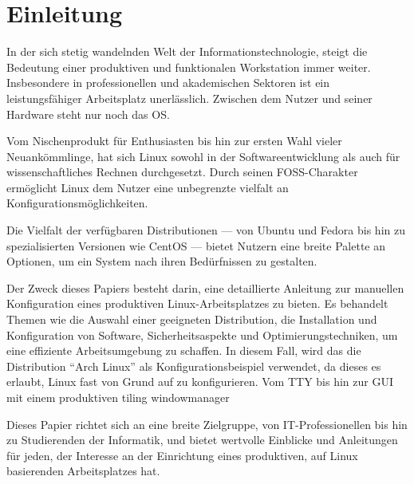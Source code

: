 \section{Einleitung}

In der sich stetig wandelnden Welt der Informationstechnologie, steigt die Bedeutung einer produktiven und funktionalen Workstation immer weiter. Insbesondere in professionellen und akademischen Sektoren ist ein leistungsfähiger Arbeitsplatz unerlässlich. Zwischen dem Nutzer und seiner Hardware steht nur noch das \Gls{OS}.

Vom Nischenprodukt für Enthusiasten bis hin zur ersten Wahl vieler Neuankömmlinge, hat sich Linux sowohl in der Softwareentwicklung als auch für wissenschaftliches Rechnen durchgesetzt. Durch seinen \gls{FOSS}-Charakter ermöglicht Linux dem Nutzer eine unbegrenzte vielfalt an Konfigurationsmöglichkeiten.

Die Vielfalt der verfügbaren Distributionen --- von Ubuntu und Fedora bis hin zu
spezialisierten Versionen wie CentOS --- bietet Nutzern eine breite Palette an
Optionen, um ein System nach ihren Bedürfnissen zu gestalten.

Der Zweck dieses Papiers besteht darin, eine detaillierte Anleitung zur
manuellen Konfiguration eines produktiven Linux-Arbeitsplatzes zu bieten. Es
behandelt Themen wie die Auswahl einer geeigneten Distribution, die Installation
und Konfiguration von Software, Sicherheitsaspekte und Optimierungstechniken, um
eine effiziente Arbeitsumgebung zu schaffen. In diesem Fall, wird das die Distribution \enquote{Arch Linux} als Konfigurationsbeispiel verwendet, da dieses es erlaubt, Linux fast von Grund auf zu konfigurieren. Vom \gls{TTY} bis hin zur \gls{GUI} mit einem produktiven \gls{tiling} \gls{windowmanager}

Dieses Papier richtet sich an eine breite Zielgruppe, von IT-Professionellen bis
hin zu Studierenden der Informatik, und bietet wertvolle Einblicke und
Anleitungen für jeden, der Interesse an der Einrichtung eines produktiven, auf
Linux basierenden Arbeitsplatzes hat.